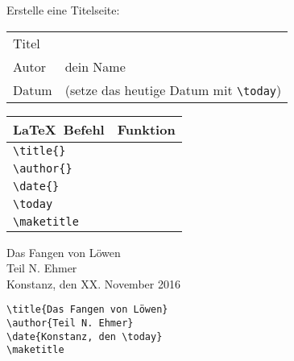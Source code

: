 \begin{frame}[fragile]
	\begin{Aufgabe}
		Erstelle eine Titelseite:
		\begin{center}
			\begin{tabular}{ll}
				Titel	&	\qquote{Das Fangen von Löwen}													\\
				Autor	&	dein Name																		\\
				Datum	&	\qquote{Konstanz, den XX} (setze das heutige Datum mit \lstinline[basicstyle=\normalfont\normalsize]|\today|)	\\
			\end{tabular}
		\end{center}
	\end{Aufgabe}
	\btVFill\Befehle
	\begin{center}
		\begin{tabular}{ll}
			\toprule
			\LaTeX\ Befehl									&	Funktion					\\ \midrule
			\lstinline|\title{}|	&	\\
			\lstinline|\author{}|	&	\\
			\lstinline|\date{}|		&	\\
			\lstinline|\today|		&	\\
			\lstinline|\maketitle|	&	\\
			\bottomrule
		\end{tabular}
	\end{center}
	\vspace{0.1cm}
\end{frame}
\begin{frame}[fragile]
	\Losung
	\begin{outputbox}
		\begin{center}
			\textsf{{\LARGE Das Fangen von Löwen}
			\\\vspace{0.5cm}
			Teil N. Ehmer
			\\\vspace{0.2cm}
			Konstanz, den XX. November 2016}
		\end{center}
	\end{outputbox}
		
	\Code
	\begin{lstlisting}
\title{Das Fangen von Löwen}
\author{Teil N. Ehmer}
\date{Konstanz, den \today}
\maketitle
	\end{lstlisting}
\end{frame}